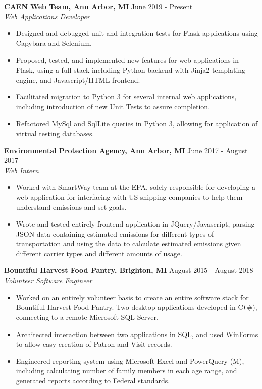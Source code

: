 \documentclass[overlapped]{res}
\begin{document}
\begin{resume}
    \textbf{CAEN Web Team, Ann Arbor, MI}
    \hfill June 2019 - Present \\
    {\sl Web Applications Developer}
    \begin{itemize}  \itemsep -2pt %
        \item Designed and debugged unit and integration tests for Flask applications using Capybara and Selenium.
        \item Proposed, tested, and implemented new features for web applications in Flask, using a full stack including Python backend with Jinja2 templating engine, and Javascript/HTML frontend.
        \item Facilitated migration to Python 3 for several internal web applications, including introduction of new Unit Tests to assure completion.
        \item Refactored MySql and SqlLite queries in Python 3, allowing for application of virtual testing databases.

    \end{itemize}

    \textbf{Environmental Protection Agency, Ann Arbor, MI}
    \hfill June 2017 - August 2017 \\
    {\sl Web Intern}
    \begin{itemize}  \itemsep -2pt %
        \item Worked with SmartWay team at the EPA, solely responsible for developing a web application for interfacing with US shipping companies to help them understand emissions and set goals.
        \item Wrote and tested entirely-frontend application in JQuery/Javascript, parsing JSON data containing estimated emissions for different types of transportation and using the data to calculate estimated emissions given different carrier types and different amounts of usage.

    \end{itemize}

    \textbf{Bountiful Harvest Food Pantry, Brighton, MI}
    \hfill August 2015 - August 2018 \\
    {\sl Volunteer Software Engineer}
    \begin{itemize}  \itemsep -2pt %
        \item Worked on an entirely volunteer basis to create an entire software stack for Bountiful Harvest Food Pantry. Two desktop applications developed in C\texttt(\#), connecting to a remote Microsoft SQL Server.
        \item Architected interaction between two applications in SQL, and used WinForms to allow easy creation of Patron and Visit records.
        \item Engineered reporting system using Microsoft Excel and PowerQuery (M), including calculating number of family members in each age range, and generated reports according to Federal standards.
    \end{itemize}


\end{resume}
\end{document}
